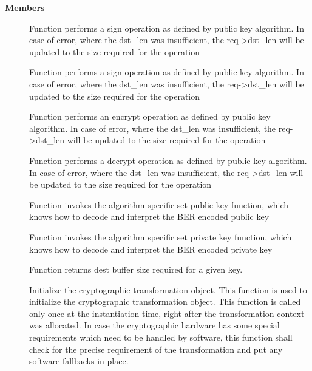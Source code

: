 \documentclass[a4paper,8pt,english]{sphinxmanual}
\begin{document}
\textbf{Members}
\begin{description}
\item[{}] \leavevmode
Function performs a sign operation as defined by public key
algorithm. In case of error, where the dst\_len was insufficient,
the req-\textgreater{}dst\_len will be updated to the size required for the
operation

\item[{}] \leavevmode
Function performs a sign operation as defined by public key
algorithm. In case of error, where the dst\_len was insufficient,
the req-\textgreater{}dst\_len will be updated to the size required for the
operation

\item[{}] \leavevmode
Function performs an encrypt operation as defined by public key
algorithm. In case of error, where the dst\_len was insufficient,
the req-\textgreater{}dst\_len will be updated to the size required for the
operation

\item[{}] \leavevmode
Function performs a decrypt operation as defined by public key
algorithm. In case of error, where the dst\_len was insufficient,
the req-\textgreater{}dst\_len will be updated to the size required for the
operation

\item[{}] \leavevmode
Function invokes the algorithm specific set public key
function, which knows how to decode and interpret
the BER encoded public key

\item[{}] \leavevmode
Function invokes the algorithm specific set private key
function, which knows how to decode and interpret
the BER encoded private key

\item[{}] \leavevmode
Function returns dest buffer size required for a given key.

\item[{}] \leavevmode
Initialize the cryptographic transformation object.
This function is used to initialize the cryptographic
transformation object. This function is called only once at
the instantiation time, right after the transformation context
was allocated. In case the cryptographic hardware has some
special requirements which need to be handled by software, this
function shall check for the precise requirement of the
transformation and put any software fallbacks in place.


\end{description}
\end{document}
